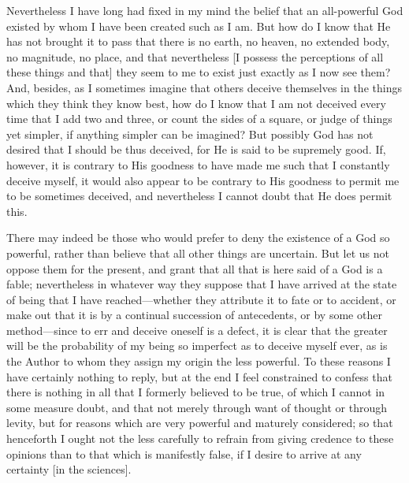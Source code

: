 Nevertheless I have long had fixed in my mind the belief that an
all-powerful God existed by whom I have been created such as I am. But
how do I know that He has not brought it to pass that there is no
earth, no heaven, no extended body, no magnitude, no place, and that
nevertheless [I possess the perceptions of all these things and that]
they seem to me to exist just exactly as I now see them? And, besides,
as I sometimes imagine that others deceive themselves in the things
which they think they know best, how do I know that I am not deceived
every time that I add two and three, or count the sides of a square,
or judge of things yet simpler, if anything simpler can be imagined?
But possibly God has not desired that I should be thus deceived, for
He is said to be supremely good. If, however, it is contrary to His
goodness to have made me such that I constantly deceive myself, it
would also appear to be contrary to His goodness to permit me to be
sometimes deceived, and nevertheless I cannot doubt that He does
permit this.

There may indeed be those who would prefer to deny the existence of a
God so powerful, rather than believe that all other things are
uncertain. But let us not oppose them for the present, and grant that
all that is here said of a God is a fable; nevertheless in whatever
way they suppose that I have arrived at the state of being that I have
reached---whether they attribute it to fate or to accident, or make
out that it is by a continual succession of antecedents, or by some
other method---since to err and deceive oneself is a defect, it is
clear that the greater will be the probability of my being so
imperfect as to deceive myself ever, as is the Author to whom they
assign my origin the less powerful. To these reasons I have certainly
nothing to reply, but at the end I feel constrained to confess that
there is nothing in all that I formerly believed to be 
true, of which I cannot in some measure doubt, and that not merely
through want of thought or through levity, but for reasons which are
very powerful and maturely considered; so that henceforth I ought not
the less carefully to refrain from giving credence to these opinions
than to that which is manifestly false, if I desire to arrive at any
certainty [in the sciences].

